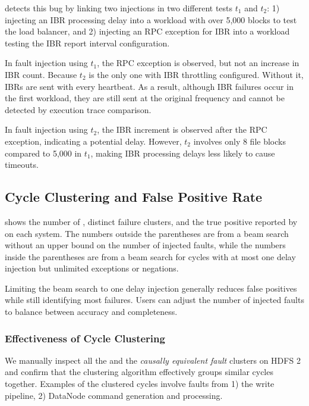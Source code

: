\tool detects this bug by linking two injections in two different tests $t_1$ and $t_2$: 1) injecting an IBR processing delay into a workload with over 5,000 blocks to test the load balancer, and 2) injecting an RPC exception for IBR into a workload testing the IBR report interval configuration. 

In fault injection using $t_1$, the RPC exception is observed, but not an increase in IBR count. 
Because $t_2$ is the only one with IBR throttling configured. 
Without it, IBRs are sent with every heartbeat. 
As a result, 
although IBR failures occur in the first workload, they are still sent at the original frequency and cannot be detected by execution trace comparison. 

In fault injection using $t_2$, 
the IBR increment is observed 
after the RPC exception, indicating a potential delay. 
However, $t_2$ involves only 8 file blocks 
compared to 5,000 in $t_1$, 
making IBR processing delays less likely to cause timeouts.


\subsection{Cycle Clustering and False Positive Rate}
\label{sec:eval:fp}



 shows the number of \vcs, distinct failure clusters, and the true positive reported by \tool on each system. 
The numbers outside the parentheses are from a beam search without an upper bound on the number of injected faults, while the numbers inside the parentheses are from a beam search for cycles with at most one delay injection but unlimited exceptions or negations.

Limiting the beam search to one delay injection generally reduces false positives while still identifying most failures. Users can adjust the number of injected faults to balance between accuracy and completeness.



\subsubsection{Effectiveness of Cycle Clustering}

We manually inspect all the \vcs and the \textit{causally equivalent fault} clusters on HDFS 2 and confirm that the clustering algorithm effectively groups similar cycles together. Examples of the clustered cycles involve faults from 1) the write pipeline, 2) DataNode command generation and processing. 

